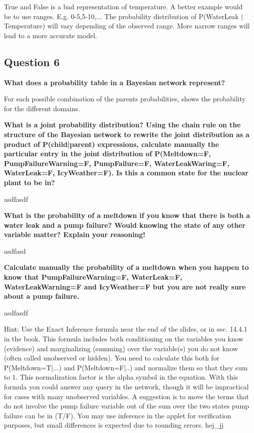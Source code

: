 \documentclass[12pt,a4paper]{article}
\begin{document}
True and False is a bad representation of temperature. A better example would be to use ranges. E.g. 0-5,5-10,... The probability distribution of P(WaterLeak $|$ Temperature) will vary depending of the observed range. More narrow ranges will lead to a more accurate model.

\subsection{Question 6}
\textbf{What does a probability table in a Bayesian network represent?}

For each possible combination of the parents probabilities, shows the probability for the different domains. 

\textbf{What is a joint probability distribution? Using the chain rule on the structure of the Bayesian network to rewrite the joint distribution as a product of P(child|parent) expressions, calculate manually the particular entry in the joint distribution of P(Meltdown=F, PumpFailureWarning=F, PumpFailure=F, WaterLeakWaring=F, WaterLeak=F, IcyWeather=F). Is this a common state for the nuclear plant to be in?}

asdfasdf

\textbf{What is the probability of a meltdown if you know that there is both a water leak and a pump failure? Would knowing the state of any other variable matter? Explain your reasoning!}

asdfasd

\textbf{Calculate manually the probability of a meltdown when you happen to know that PumpFailureWarning=F, WaterLeak=F, WaterLeakWarning=F and IcyWeather=F but you are not really sure about a pump failure.}

asdfasdf

    Hint: Use the Exact Inference formula near the end of the slides, or in sec. 14.4.1 in the book. This formula includes both conditioning on the variables you know (evidence) and marginalizing (summing) over the variable(s) you do not know (often called unobserved or hidden). You need to calculate this both for P(Meltdown=T|...) and P(Meltdown=F|..) and normalize them so that they sum to 1. This normalization factor is the alpha symbol in the equation. With this formula you could answer any query in the network, though it will be impractical for cases with many unobserved variables. A suggestion is to move the terms that do not involve the pump failure variable out of the sum over the two states pump failure can be in (T/F). You may use inference in the applet for verification purposes, but small differences is expected due to rounding errors. 
    hej\_jj
\end{document}
